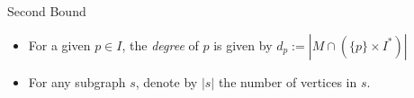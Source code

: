 \begin{frame}{Second Bound}

\begin{itemize}
	
	
\pause\item
For a given $p \in I$, the \emph{degree} of $p$ 
is given by $d_p := |M \cap (\{p\} \times I^*)|$ 

\pause\item
For any subgraph $s$, denote by $|s|$ the number of vertices in $s$.


\end{itemize}
\end{frame}